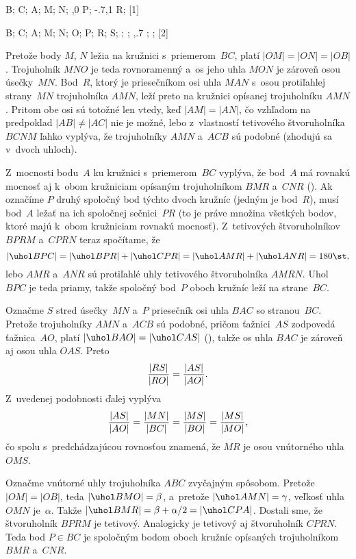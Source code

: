 {%
\fontplace
\trpoint B; \tlpoint C; \bpoint A;
\rBpoint M; \lBpoint N;
\tpoint{},0 P; \rpoint\xy-.7,1 R;
[1] \hfil\Obr

\fontplace
\tpoint B; \tpoint C; \bpoint A;
\rBpoint M; \lBpoint N;
\tpoint O; \tpoint P; \lpoint R;
\lBpoint S;
\cpoint\beta; \cpoint\gamma;
\cpoint{},.7 \beta; \cpoint\gamma;
[2] \hfil\Obr

Pretože body $M$, $N$ ležia na kružnici s~priemerom~$BC$, platí
$|OM|=|ON|=|OB|$. Trojuholník $MNO$ je teda rovnoramenný a~os
jeho uhla $MON$ je zároveň osou úsečky~$MN$. Bod~$R$, ktorý je
priesečníkom osi uhla $M\!AN$ s~osou protiľahlej strany~$MN$ trojuholníka
$AMN$, leží preto na kružnici opísanej trojuholníku $AMN$. Pritom obe osi
sú totožné len vtedy, keď $|AM|=|AN|$, čo vzhľadom na predpoklad
$|AB|\ne|AC|$ nie je možné, lebo z~vlastností tetivového
štvoruholníka $BCNM$ ľahko vyplýva, že trojuholníky $AMN$ a~$ACB$ sú
podobné (zhodujú sa v~dvoch uhloch).

Z~mocnosti bodu~$A$ ku kružnici s~priemerom~$BC$ vyplýva, že bod~$A$
má rovnakú mocnosť aj k~obom kružniciam opísaným trojuholníkom $BMR$ 
a~$CNR$ (\obr).
\inspicture
Ak označíme $P$ druhý spoločný bod týchto dvoch kružníc
(jedným je bod~$R$), musí bod~$A$ ležať na ich spoločnej sečnici~$PR$
(to je práve množina všetkých bodov, ktoré majú k~obom kružniciam
rovnakú mocnosť). Z~tetivových štvoruholníkov $BPRM$ a~$CPRN$ teraz
spočítame, že
$$
|\uhol BPC|=|\uhol BPR|+|\uhol CPR|=|\uhol AMR|+|\uhol ANR|=180\st,
$$
lebo $AMR$ a~$ANR$ sú protiľahlé uhly tetivového štvoruholníka
$AMRN$. Uhol $BPC$ je teda priamy, takže spoločný bod~$P$ oboch
kružníc leží na strane~$BC$.

\ineriesenie
Označme $S$ stred úsečky~$MN$ a~$P$ priesečník osi uhla $BAC$ so
stranou~$BC$. Pretože trojuholníky $AMN$ a~$ACB$ sú podobné, pričom
ťažnici~$AS$ zodpovedá ťažnica~$AO$, platí $|\uhol BAO|=|\uhol CAS|$ (\obr),
\inspicture
takže os uhla $BAC$ je zároveň aj osou uhla $OAS$. Preto
$$
{|RS|\over|RO|}={|AS|\over|AO|}.
$$
Z~uvedenej podobnosti ďalej vyplýva
$$
{|AS|\over|AO|}={|MN|\over|BC|}=
{|MS|\over|BO|}={|MS|\over|MO|},
$$
čo spolu s~predchádzajúcou rovnosťou znamená, že $MR$ je osou vnútorného
uhla $OMS$.

Označme vnútorné uhly trojuholníka $ABC$ zvyčajným spôsobom.
Pretože $|OM|=|OB|$, teda $|\uhol BMO|=\beta$, a~pretože $|\uhol
AMN|=\gamma$, veľkosť uhla $OMN$ je~$\alpha$. Takže $|\uhol
BMR|=\beta+\alpha/2=|\uhol CPA|$. Dostali sme, že štvoruholník $BPRM$
je tetivový. Analogicky je tetivový aj štvoruholník $CPRN$. Teda
bod $P\in BC$ je spoločným bodom oboch kružníc opísaných trojuholníkom $BMR$
a~$CNR$.}

